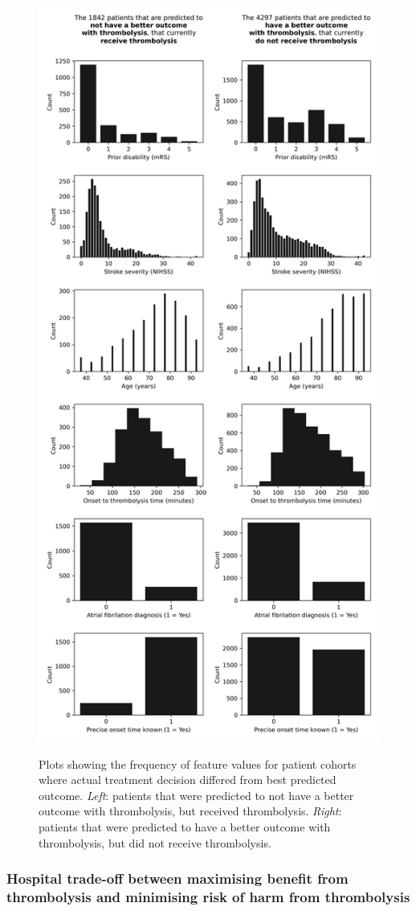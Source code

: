 \begin{figure}
    \centering
    \captionsetup{width=1\linewidth}
    \includegraphics[width=0.6\linewidth]{./images/210_xgb_all_data_multiclass_outcome_descriptive_plots_2_patient_cohorts}\\
  \caption{Plots showing the frequency of feature values for patient cohorts where actual treatment decision differed from best predicted outcome. \textit{Left}: patients that were predicted to not have a better outcome with thrombolysis, but received thrombolysis. \textit{Right}: patients that were predicted to have a better outcome with thrombolysis, but did not receive thrombolysis.}
  \label{fig:decriptive_plots_2_cohorts}
\end{figure}


\subsubsection{Hospital trade-off between maximising benefit from thrombolysis and minimising risk of harm from thrombolysis}

